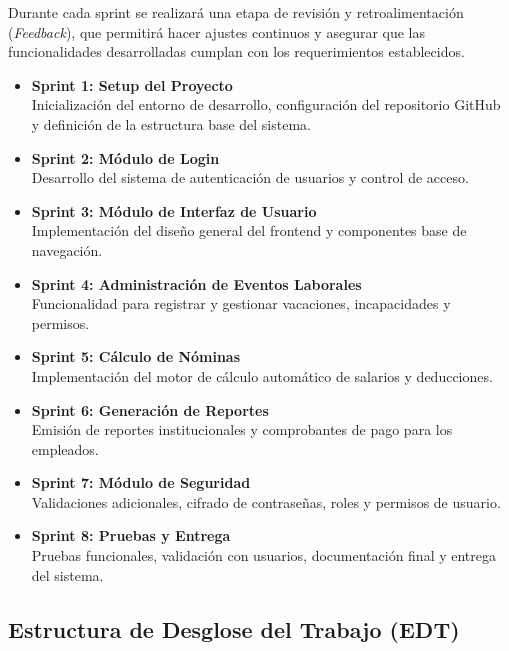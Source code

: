 Durante cada sprint se realizará una etapa de revisión y retroalimentación (\textit{Feedback}), que permitirá hacer ajustes continuos y asegurar que las funcionalidades desarrolladas cumplan con los requerimientos establecidos.


\begin{itemize}
	\item \textbf{Sprint 1: Setup del Proyecto} \\
	      Inicialización del entorno de desarrollo, configuración del repositorio GitHub y definición de la estructura base del sistema.

	\item \textbf{Sprint 2: Módulo de Login} \\
	      Desarrollo del sistema de autenticación de usuarios y control de acceso.

	\item \textbf{Sprint 3: Módulo de Interfaz de Usuario} \\
	      Implementación del diseño general del frontend y componentes base de navegación.

	\item \textbf{Sprint 4: Administración de Eventos Laborales} \\
	      Funcionalidad para registrar y gestionar vacaciones, incapacidades y permisos.

	\item \textbf{Sprint 5: Cálculo de Nóminas} \\
	      Implementación del motor de cálculo automático de salarios y deducciones.

	\item \textbf{Sprint 6: Generación de Reportes} \\
	      Emisión de reportes institucionales y comprobantes de pago para los empleados.

	\item \textbf{Sprint 7: Módulo de Seguridad} \\
	      Validaciones adicionales, cifrado de contraseñas, roles y permisos de usuario.

	\item \textbf{Sprint 8: Pruebas y Entrega} \\
	      Pruebas funcionales, validación con usuarios, documentación final y entrega del sistema.
\end{itemize}

\newpage

\subsection{Estructura de Desglose del Trabajo (EDT)}

